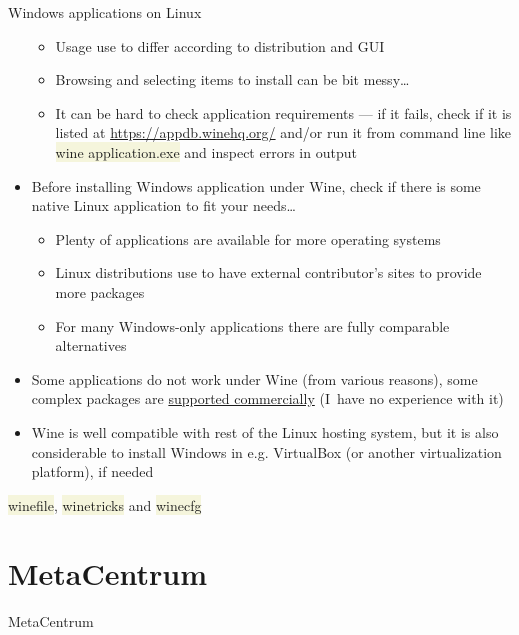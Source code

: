 \documentclass[compress, ucs, xelatex, 11pt, xcolor=svgnames, aspectratio=169,
	hyperref={
		bookmarks=true,
		unicode=true,
		colorlinks=true,
		pdftitle={Linux, command line and MetaCentrum},
		plainpages=false,
		pdfauthor={Vojtech Zeisek},
		pdfsubject={Course about use of Linux command line, writing shell scripts and using MetaCentrum of CESNET},
		pdfcreator={XeLaTeX},
		pdfkeywords={Linux, GNU, BASH, shell, command line, MetaCentrum},
		linkcolor=DarkRed, %
		anchorcolor=DarkBlue, %
		citecolor=Indigo, %
		filecolor=NavyBlue, %
		menucolor=DarkMagenta, %
		urlcolor=DarkBlue, %
		pdftex},
	url={hyphens, lowtilde} %
	]{beamer}
\renewcommand{\texttt}[1]{\colorbox{Beige}{{\ttfamily #1}}}
\begin{document}
\begin{frame}[allowframebreaks]{Windows applications on Linux}
\begin{itemize}
		\begin{itemize}
			\item Usage use to differ according to distribution and GUI
			\item Browsing and selecting items to install can be bit messy\ldots
			\item It can be hard to check application requirements --- if it fails, check if it is listed at \url{https://appdb.winehq.org/} and/or run it from command line like \texttt{wine application.exe} and inspect errors in output
		\end{itemize}
		\item Before installing Windows application under Wine, check if there is some native Linux application to fit your needs\ldots
		\begin{itemize}
			\item Plenty of applications are available for more operating systems
			\item Linux distributions use to have external contributor's sites to provide more packages
			\item For many Windows-only applications there are fully comparable alternatives
		\end{itemize}
		\item Some applications do not work under Wine (from various reasons), some complex packages are \href{https://www.codeweavers.com/}{supported commercially} (I~have no experience with it)
		\item Wine is well compatible with rest of the Linux hosting system, but it is also considerable to install Windows in e.g. VirtualBox (or another virtualization platform), if needed
	\end{itemize}
	\begin{center}
		\texttt{[image: wine.png]}
	\end{center}
	\begin{flushright}
		\texttt{winefile}, \texttt{winetricks} and \texttt{winecfg}
	\end{flushright}
\end{frame}

\section{MetaCentrum}

\begin{frame}{MetaCentrum}
	\tableofcontents[currentsection, sectionstyle=show/hide, hideothersubsections]
\end{frame}
\end{document}
